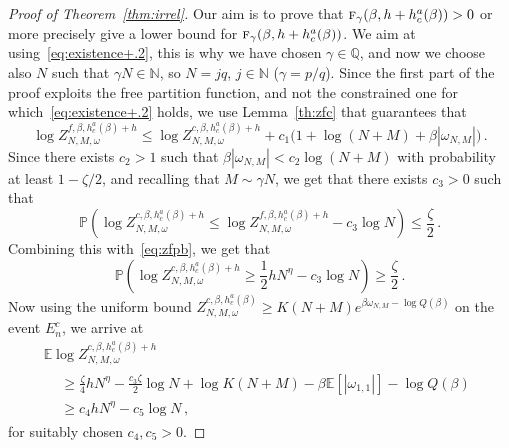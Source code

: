 \documentclass[AHL,Unicode,longabstracts]{cedram}
\newcommand{\tf}{\textsc{f}} %
\newcommand{\bbE}{\ensuremath{\mathbb{E}}}
\newcommand{\bbN}{\ensuremath{\mathbb{N}}}
\newcommand{\bbP}{\ensuremath{\mathbb{P}}}
\newcommand{\bbQ}{\ensuremath{\mathbb{Q}}}
\begin{document}
\begin{proof}[Proof of Theorem~\ref{thm:irrel}]
Our aim is to prove that $\tf_\gamma(\beta, h+ h_c^{a}(\beta)) >0$ or more precisely give a lower bound for $\tf_\gamma(\beta, h+ h_c^{a}(\beta))$. We aim at using~\eqref{eq:existence+.2}, this is why we have chosen $\gamma\in \bbQ$, and now we choose also $N$ such that $\gamma N \in \bbN$, so $N=jq$, $j\in \bbN$ ($\gamma=p/q$). Since the first part of the proof exploits the free partition function, and not the constrained one for which~\eqref{eq:existence+.2} holds, we use Lemma~\ref{th:zfc} that guarantees that
\begin{equation}\label{eq:zfc1}
\log Z^{f, \beta, h_c^a(\beta) +h}_{N,M,\omega} \le
\log Z^{c, \beta, h_c^a(\beta) +h}_{N,M,\omega} + c_1\big(1 + \log (N+M) + \beta | \omega_{N,M}| \big)\,.
\end{equation}
Since there exists $c_2 >1$ such that $\beta | \omega_{N,M}| < c_2 \log (N+M)$ with probability at least $1-\zeta/2$, and recalling that $M\sim \gamma N$, we get that there exists $c_3>0$ such that
\[
\bbP \left(\log Z^{c, \beta, h_c^a(\beta) +h}_{N,M,\omega} \le \log Z^{f, \beta, h_c^a(\beta) +h}_{N,M,\omega} - c_3 \log N \right) \leq \frac{\zeta}{2}\,.
\]
Combining this with~\eqref{eq:zfpb}, we get that
\begin{equation}\label{eq:hA}
\bbP \left(\log Z^{c, \beta, h_c^a(\beta) +h}_{N,M,\omega} \ge \frac{1}{2} h N^{ \eta} - c_3\log N \right) \ge \frac{\zeta}{2}
\,.
\end{equation}
Now using the uniform bound $Z^{c, \beta, h_c^a(\beta)}_{N,M,\omega} \ge K(N+M) e^{\beta \omega_{N,M} - \log Q(\beta) }$ on the event $E_n^c$, we arrive at
\begin{multline}\label{eq:irZ}
\bbE \log Z_{N,M,\omega}^{c,\beta,h_c^a(\beta)+h}\\
\begin{aligned}
& \ge \frac{\zeta}{4} h N^{\eta} - \frac{c_3\zeta}{2} \log N + \log K(N+M) - \beta \bbE [|\omega_{1,1}|] - \log Q(\beta) \\
& \ge c_4 h N^{\eta} - c_5\log N\,,
\end{aligned}
\end{multline}
for suitably chosen $c_4,c_5 >0$.




\end{proof}
\end{document}
